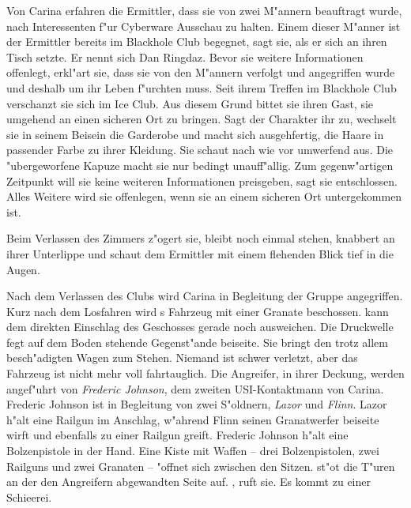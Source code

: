 Von Carina erfahren die Ermittler, dass sie von zwei M"annern beauftragt wurde, nach Interessenten f"ur Cyberware Ausschau zu halten. Einem dieser M"anner ist der Ermittler bereits im Blackhole Club begegnet, sagt sie, als er sich an ihren Tisch setzte. Er nennt sich Dan Ringdaz. Bevor sie weitere Informationen offenlegt, erkl"art sie, dass sie von den M"annern verfolgt und angegriffen wurde und deshalb um ihr Leben f"urchten muss. Seit ihrem Treffen im Blackhole Club verschanzt sie sich im Ice Club. Aus diesem Grund bittet sie ihren Gast, sie umgehend an einen sicheren Ort zu bringen. Sagt der Charakter ihr zu, wechselt sie in seinem Beisein die Garderobe und macht sich ausgehfertig, die Haare in passender Farbe zu ihrer Kleidung. Sie schaut nach wie vor umwerfend aus. Die "ubergeworfene Kapuze macht sie nur bedingt unauff"allig. Zum gegenw"artigen Zeitpunkt will sie keine weiteren Informationen preisgeben, sagt sie entschlossen. Alles Weitere wird sie offenlegen, wenn sie an einem sicheren Ort untergekommen ist.

Beim Verlassen des Zimmers z"ogert sie, bleibt noch einmal stehen, knabbert an ihrer Unterlippe und schaut dem Ermittler mit einem flehenden Blick tief in die Augen.


Nach dem Verlassen des Clubs wird Carina in Begleitung der Gruppe angegriffen. Kurz nach dem Losfahren wird \xl{}s Fahrzeug mit einer Granate beschossen. \xl{} kann dem direkten Einschlag des Geschosses gerade noch ausweichen. Die Druckwelle fegt auf dem Boden stehende Gegenst"ande beiseite. Sie bringt den trotz allem besch"adigten Wagen zum Stehen. Niemand ist schwer verletzt, aber das Fahrzeug ist nicht mehr voll fahrtauglich. Die Angreifer, in ihrer Deckung, werden angef"uhrt von \emph{Frederic Johnson}, dem zweiten USI-Kontaktmann von Carina. Frederic Johnson ist in Begleitung von zwei S"oldnern, \emph{Lazor} und \emph{Flinn}. Lazor h"alt eine Railgun im Anschlag, w"ahrend Flinn seinen Granatwerfer beiseite wirft und ebenfalls zu einer Railgun greift. Frederic Johnson h"alt eine Bolzenpistole in der Hand. Eine Kiste mit Waffen -- drei Bolzenpistolen, zwei Railguns und zwei Granaten -- "offnet sich zwischen den Sitzen. \xl{} st"o\3t die T"uren an der den Angreifern abgewandten Seite auf. , ruft sie. Es kommt zu einer Schie\3erei.

